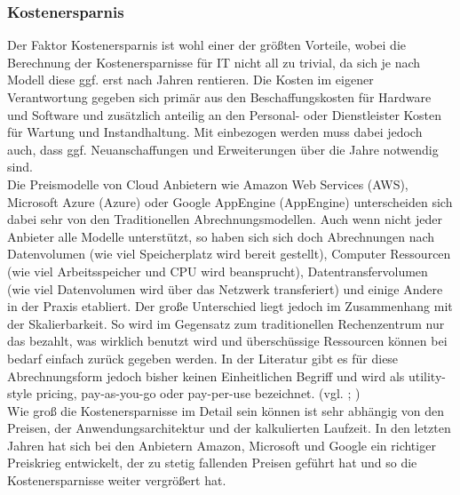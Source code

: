 \subsubsection{Kostenersparnis}\label{kostenersparnis}
Der Faktor Kostenersparnis ist wohl einer der größten Vorteile, wobei die Berechnung der Kostenersparnisse für IT nicht all zu trivial, da sich je nach Modell diese ggf. erst nach Jahren rentieren. Die Kosten im eigener Verantwortung gegeben sich primär aus den Beschaffungskosten für Hardware und Software und zusätzlich anteilig an den Personal- oder Dienstleister Kosten für Wartung und Instandhaltung. Mit einbezogen werden muss dabei jedoch auch, dass ggf. Neuanschaffungen und Erweiterungen über die Jahre notwendig sind.\\
 Die Preismodelle von Cloud Anbietern wie Amazon Web Services (AWS), Microsoft Azure (Azure) oder Google AppEngine (AppEngine) unterscheiden sich dabei sehr von den Traditionellen Abrechnungsmodellen. Auch wenn nicht jeder Anbieter alle Modelle unterstützt, so haben sich sich doch Abrechnungen nach Datenvolumen (wie viel Speicherplatz wird bereit gestellt), Computer Ressourcen (wie viel Arbeitsspeicher und CPU wird beansprucht), Datentransfervolumen (wie viel Datenvolumen wird über das Netzwerk transferiert) und einige Andere in der Praxis etabliert. Der große Unterschied liegt jedoch im Zusammenhang mit der Skalierbarkeit. So wird im Gegensatz zum traditionellen Rechenzentrum nur das bezahlt, was wirklich benutzt wird und überschüssige Ressourcen können bei bedarf einfach zurück gegeben werden. In der Literatur gibt es für diese Abrechnungsform jedoch bisher keinen Einheitlichen Begriff und wird als utility-style pricing, pay-as-you-go oder pay-per-use bezeichnet. (vgl. \citeauthor*[S. 879]{Jadeja.2012}; \citeauthor*[S. 313]{Achimugu.2012}) \\
 Wie groß die Kostenersparnisse im Detail sein können ist sehr abhängig von den Preisen, der Anwendungsarchitektur und der kalkulierten Laufzeit. In den letzten Jahren hat sich bei den Anbietern Amazon, Microsoft und Google ein richtiger Preiskrieg entwickelt, der zu stetig fallenden Preisen geführt hat und so die Kostenersparnisse weiter vergrößert hat. 

